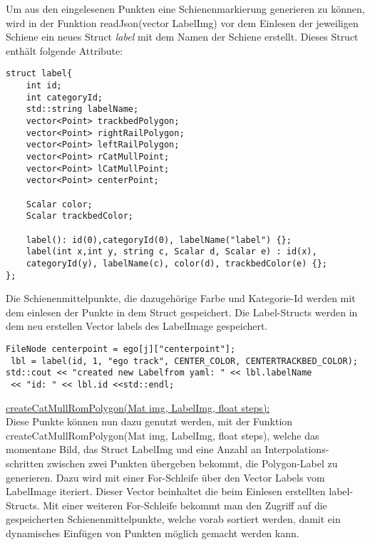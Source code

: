 \noindent
Um aus den eingelesenen Punkten eine Schienenmarkierung generieren zu können, wird in der Funktion readJson(vector LabelImg) vor dem Einlesen der jeweiligen Schiene ein neues Struct \textit{label} mit dem Namen der Schiene erstellt. Dieses Struct enthält folgende Attribute:
\lstset{language=c++}
\begin{lstlisting}[frame=htrbl, caption={Struct Label}, label={lst:result2}]
struct label{
    int id;
    int categoryId;
    std::string labelName;
    vector<Point> trackbedPolygon;
    vector<Point> rightRailPolygon;
    vector<Point> leftRailPolygon;
    vector<Point> rCatMullPoint;
    vector<Point> lCatMullPoint;
    vector<Point> centerPoint;

    Scalar color;
    Scalar trackbedColor;

    label(): id(0),categoryId(0), labelName("label") {};
    label(int x,int y, string c, Scalar d, Scalar e) : id(x),
    categoryId(y), labelName(c), color(d), trackbedColor(e) {};
};
\end{lstlisting}
\noindent
Die Schienenmittelpunkte, die dazugehörige Farbe und Kategorie-Id werden mit dem einlesen der Punkte in dem Struct gespeichert. Die Label-Structs werden in dem neu erstellen Vector labels des LabelImage gespeichert. 

\lstset{language=c++}
\begin{lstlisting}[frame=htrbl, caption={create Labell}, label={lst:result2}]
FileNode centerpoint = ego[j]["centerpoint"];
 lbl = label(id, 1, "ego track", CENTER_COLOR, CENTERTRACKBED_COLOR);
std::cout << "created new Labelfrom yaml: " << lbl.labelName
 << "id: " << lbl.id <<std::endl;
\end{lstlisting}
\noindent
\underline{createCatMullRomPolygon(Mat img, LabelImg, float steps):}
\\

\noindent
Diese Punkte können nun dazu genutzt werden, mit der Funktion createCatMullRomPolygon(Mat img, LabelImg, float steps), welche das momentane Bild, das Struct LabelImg und eine Anzahl an Interpolations-schritten zwischen zwei Punkten übergeben bekommt, die Polygon-Label zu generieren. Dazu wird mit einer For-Schleife über den Vector Labels vom LabelImage iteriert. Dieser Vector beinhaltet die beim Einlesen erstellten label-Structs. Mit einer weiteren For-Schleife bekommt man den Zugriff auf die gespeicherten Schienenmittelpunkte, welche vorab sortiert werden, damit ein dynamisches Einfügen von Punkten möglich gemacht werden kann.
\\


